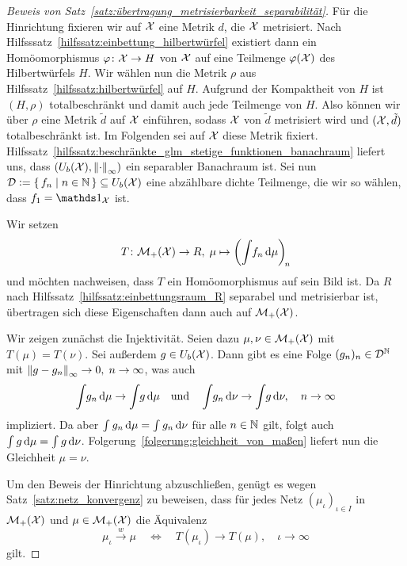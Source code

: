 \documentclass[../main/main.tex]{subfiles}
\begin{document}
	\begin{proof}[Beweis von Satz~\ref{satz:übertragung_metrisierbarkeit_separabilität}]
		Für die Hinrichtung fixieren wir auf $\mathcal{X}$ eine Metrik $d$, die $\mathcal{X}$ metrisiert. 
		Nach Hilfsssatz~\ref{hilfssatz:einbettung_hilbertwürfel} existiert dann ein Homöomorphismus $\varphi \colon \mathcal{X} \to H$ von
		$\mathcal{X}$ auf eine Teilmenge $\varphi(\mathcal{X})$ des Hilbertwürfels $H$. Wir wählen nun die Metrik $\rho$ aus Hilfssatz~\ref{hilfssatz:hilbertwürfel} auf $H$. Aufgrund der Kompaktheit von $H$ ist
		$(H, \rho)$ totalbeschränkt und damit auch jede Teilmenge von $H$. Also können wir über $\rho$ eine Metrik $\tilde{d}$ auf $\mathcal{X}$ einführen, sodass $\mathcal{X}$ von $\tilde{d}$ 
		metrisiert wird und $(\mathcal{X}, \tilde{d})$ totalbeschränkt ist. Im Folgenden sei auf $\mathcal{X}$ diese Metrik fixiert. Hilfssatz~\ref{hilfssatz:beschränkte_glm_stetige_funktionen_banachraum} liefert uns, dass 
		$(U_b(\mathcal{X}), \left\lVert\cdot\right\rVert_\infty)$ ein separabler Banachraum ist. Sei nun $\mathcal{D} \vcentcolon = \left\{\, f_n \; \middle| \; n \in \mathbb{N} \,\right\} \subseteq U_b(\mathcal{X})$ eine abzählbare dichte Teilmenge, 
		die wir so wählen, dass $f_1 = \indfct_\X$ ist.
		
		Wir setzen
		\[ T \colon \mathcal{M}_{+}(\mathcal{X}) \to R, \; \mu \mapsto \left( \int_{} \, f_n \, \mathrm{d}\mu \right)_{\! n}  \]
		und möchten nachweisen, dass $T$ ein Homöomorphismus auf sein Bild ist. Da $R$ nach Hilfssatz~\ref{hilfssatz:einbettungsraum_R} separabel und metrisierbar ist, übertragen sich diese Eigenschaften dann auch auf $\mathcal{M}_{+}(\mathcal{X})$.
		
		Wir zeigen zunächst die Injektivität. Seien dazu $\mu, \nu \in \mathcal{M}_{+}(\mathcal{X})$ mit $T(\mu) = T(\nu)$. 
		Sei außerdem $g \in U_b(\mathcal{X})$. Dann gibt es eine Folge $(g_n)_n \in \mathcal{D}^{\mathbb{N}}$ mit $\left\lVert g - g_n\right\rVert_\infty \to 0, \; n \to \infty$, was auch 
		\[ \int_{} \, g_n \, \mathrm{d}\mu \to \int_{} \, g \, \mathrm{d}\mu \quad \text{und} \quad \int_{} \, g_n \, \mathrm{d}\nu \to \int_{} \, g \, \mathrm{d}\nu, \quad n \to \infty \]
		impliziert. Da aber $\int_{} \, g_n \, \mathrm{d}\mu = \int_{} \, g_n \, \mathrm{d}\nu$ für alle $n \in \mathbb{N}$ gilt, folgt auch $\int_{} \, g \, \mathrm{d}\mu = \int_{} \, g \, \mathrm{d}\nu$.
		Folgerung~\ref{folgerung:gleichheit_von_maßen} liefert nun die Gleichheit $\mu = \nu$.
		
		Um den Beweis der Hinrichtung abzuschließen, genügt es wegen Satz~\ref{satz:netz_konvergenz} zu beweisen, dass für jedes Netz $(\mu_\iota)_{\iota \in I}$ in $\mathcal{M}_{+}(\mathcal{X})$ und $\mu \in \mathcal{M}_{+}(\mathcal{X})$ die
		Äquivalenz
		\[ \mu_\iota \xrightarrow{w} \mu \quad \iff \quad T(\mu_\iota) \to T(\mu), \quad \iota \to \infty  \]
		gilt.
		

\end{proof}
\end{document}
